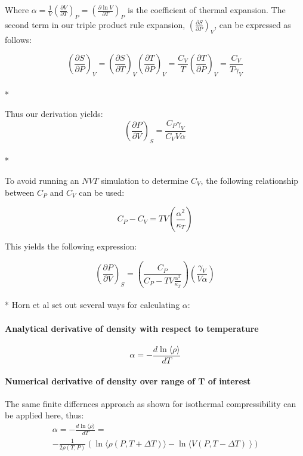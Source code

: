\documentclass[aps,pre,twocolumn,nofootinbib,superscriptaddress,linenumbers,10pt, draft,tightenlines]{revtex4-1}
\begin{document}
Where $\alpha = \frac{1}{V} \left(\frac{\partial V}{\partial T}\right)_{P} = \left(\frac{\partial \ln V}{\partial T}\right)_{P}$ is the coefficient of thermal expansion. The second term in our triple product rule expansion, $\left(\frac{\partial S}{\partial P}\right)_{V}$, can be expressed as follows:

\begin{equation}\left(\frac{\partial S}{\partial P}\right)_{V} = \left(\frac{\partial S}{\partial T}\right)_{V} \left(\frac{\partial T}{\partial P}\right)_{V} = \frac{C_V}{T} \left(\frac{\partial T}{\partial P}\right)_{V} = \frac{C_V}{T \gamma_V}\end{equation}\\* 

Thus our derivation yields:
\begin{equation}\left(\frac{\partial P}{\partial V}\right)_{S} = \frac{C_P \gamma_V}{C_V V \alpha}\end{equation}\\*

To avoid running an $NVT$ simulation to determine $C_V$, the following relationship between $C_P$ and $C_V$ can be used:

\begin{equation} C_P-C_V = TV\left(\frac{\alpha^2}{\kappa_T}\right)\end{equation}

This yields the following expression:

\begin{equation}\left(\frac{\partial P}{\partial V}\right)_{S} = \left(\frac{C_P}{C_P -TV\frac{\alpha^2}{\kappa_T}}\right)\left(\frac{\gamma_V}{V\alpha}\right)\end{equation}\\*
Horn et al set out several ways for calculating $\alpha$\cite{horn}:

\paragraph{Analytical derivative of density with respect to temperature}
\begin{equation}\alpha = -\frac{d\ln\langle \rho \rangle}{dT}\end{equation}

\paragraph{Numerical derivative of density over range of T of interest}
The same finite differnces approach as shown for isothermal compressibility can be applied here, thus:
\begin{multline}
\alpha = -\frac{d\ln\langle \rho \rangle}{dT} = \\ -\frac{1}{2\rho(T,P)} \left(\ln \langle \rho(P,T+\Delta T)\rangle - \ln \langle V(P,T-\Delta T)\right\rangle)\end{multline}
\end{document}
